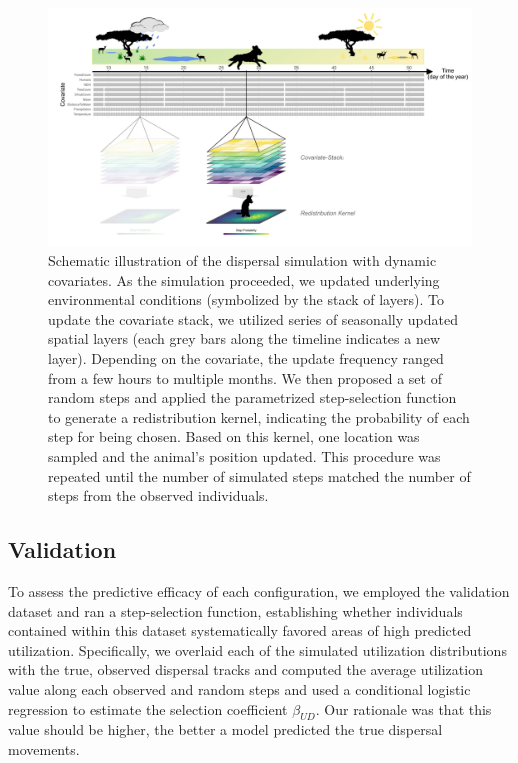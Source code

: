 \documentclass[abstract=on,10pt,a4paper,bibliography=totocnumbered]{article}
\begin{document}
\begin{figure}
 \begin{center}
  \includegraphics[width = \textwidth]{Figures/Schematic} \caption{Schematic
  illustration of the dispersal simulation with dynamic covariates. As the
  simulation proceeded, we updated underlying environmental conditions
  (symbolized by the stack of layers). To update the covariate stack, we
  utilized series of seasonally updated spatial layers (each grey bars along the
  timeline indicates a new layer). Depending on the covariate, the update
  frequency ranged from a few hours to multiple months. We then proposed a set
  of random steps and applied the parametrized step-selection function to
  generate a redistribution kernel, indicating the probability of each step for
  being chosen. Based on this kernel, one location was sampled and the animal's
  position updated. This procedure was repeated until the number of simulated
  steps matched the number of steps from the observed individuals.}
  \label{Schematic}
 \end{center}
\end{figure}

\subsection{Validation}

To assess the predictive efficacy of each configuration, we employed
the validation dataset and ran a step-selection function, establishing whether
individuals contained within this dataset systematically favored areas of high
predicted utilization. Specifically, we overlaid each of the simulated
utilization distributions with the true, observed dispersal tracks and computed
the average utilization value along each observed and random steps and used a
conditional logistic regression to estimate the selection coefficient
$\beta_{UD}$. Our rationale was that this value should be higher, the better a
model predicted the true dispersal movements.
\end{document}
